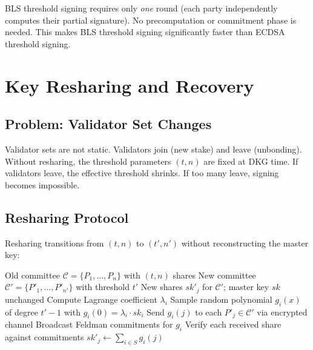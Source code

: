 \documentclass[11pt,a4paper]{article}
\begin{document}
BLS threshold signing requires only \emph{one} round (each party independently
computes their partial signature). No precomputation or commitment phase is needed.
This makes BLS threshold signing significantly faster than ECDSA threshold signing.

\section{Key Resharing and Recovery}
\label{sec:resharing}

\subsection{Problem: Validator Set Changes}

Validator sets are not static. Validators join (new stake) and leave (unbonding).
Without resharing, the threshold parameters $(t, n)$ are fixed at DKG time. If
validators leave, the effective threshold shrinks. If too many leave, signing
becomes impossible.

\subsection{Resharing Protocol}

Resharing transitions from $(t, n)$ to $(t', n')$ without reconstructing the
master key:

\begin{algorithm}[ht]
\caption{Proactive Key Resharing.}
\label{alg:resharing}
\begin{algorithmic}[1]
\Require Old committee $\mathcal{C} = \{P_1, \ldots, P_n\}$ with $(t, n)$ shares
\Require New committee $\mathcal{C}' = \{P'_1, \ldots, P'_{n'}\}$ with threshold $t'$
\Ensure New shares $sk'_j$ for $\mathcal{C}'$; master key $sk$ unchanged
  \State Compute Lagrange coefficient $\lambda_i$
  \State Sample random polynomial $g_i(x)$ of degree $t' - 1$ with $g_i(0) = \lambda_i \cdot sk_i$
  \State Send $g_i(j)$ to each $P'_j \in \mathcal{C}'$ via encrypted channel
  \State Broadcast Feldman commitments for $g_i$
\EndFor
{}
  \State Verify each received share against commitments
  \State $sk'_j \leftarrow \sum_{i \in S} g_i(j)$
\EndFor
\end{algorithmic}
\end{algorithm}
\end{document}
